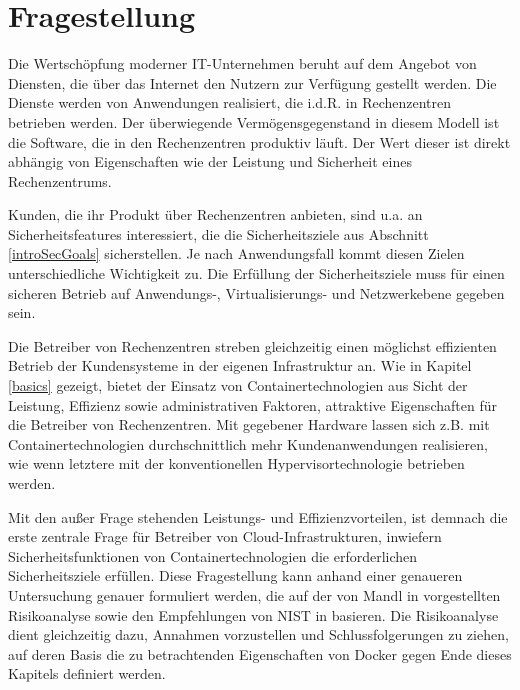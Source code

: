 \documentclass[../main.tex]{subfiles}
\begin{document}
\chapter{Fragestellung}
\label{question}
  Die Wertschöpfung moderner IT-Unternehmen beruht auf dem Angebot von Diensten, die über das Internet den Nutzern zur Verfügung gestellt werden. Die Dienste werden von Anwendungen realisiert, die i.d.R. in Rechenzentren betrieben werden. Der überwiegende Vermögensgegenstand in diesem Modell ist die Software, die in den Rechenzentren produktiv läuft. Der Wert dieser ist direkt abhängig von Eigenschaften wie der Leistung und Sicherheit eines Rechenzentrums.

  Kunden, die ihr Produkt über Rechenzentren anbieten, sind u.a. an Sicherheitsfeatures interessiert, die die Sicherheitsziele aus Abschnitt \ref{introSecGoals} sicherstellen. Je nach Anwendungsfall kommt diesen Zielen unterschiedliche Wichtigkeit zu. Die Erfüllung der Sicherheitsziele muss für einen sicheren Betrieb auf Anwendungs-, Virtualisierungs- und Netzwerkebene gegeben sein.

  Die Betreiber von Rechenzentren streben gleichzeitig einen möglichst effizienten Betrieb der Kundensysteme in der eigenen Infrastruktur an. Wie in Kapitel \ref{basics} gezeigt, bietet der Einsatz von Containertechnologien aus Sicht der Leistung, Effizienz sowie administrativen Faktoren, attraktive Eigenschaften für die Betreiber von Rechenzentren. Mit gegebener Hardware lassen sich z.B. mit Containertechnologien durchschnittlich mehr Kundenanwendungen realisieren, wie wenn letztere mit der konventionellen Hypervisortechnologie betrieben werden.


  Mit den außer Frage stehenden Leistungs- und Effizienzvorteilen, ist demnach die erste zentrale Frage für Betreiber von Cloud-Infrastrukturen, inwiefern Sicherheitsfunktionen von Containertechnologien die erforderlichen Sicherheitsziele erfüllen. Diese Fragestellung kann anhand einer genaueren Untersuchung genauer formuliert werden, die auf der von Mandl in \cite[S.36]{CISSP} vorgestellten Risikoanalyse sowie den Empfehlungen von NIST in \cite[S.23]{nist} basieren. Die Risikoanalyse dient gleichzeitig dazu, Annahmen vorzustellen und Schlussfolgerungen zu ziehen, auf deren Basis die zu betrachtenden Eigenschaften von Docker gegen Ende dieses Kapitels definiert werden.
\end{document}

